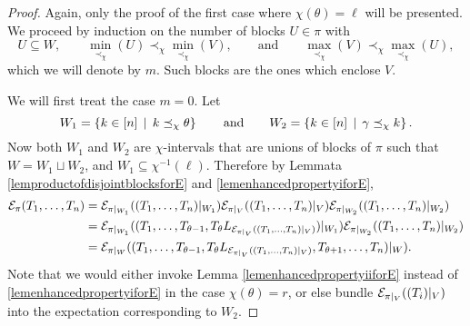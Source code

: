 		\begin{proof}
			Again, only the proof of the first case where $\chi(\theta) = \ell$ will be presented.
			We proceed by induction on the number of blocks $U\in\pi$ with
			\[
				U\subseteq W, \qquad
				\min_{\prec_\chi}(U) \prec_{\chi} \min_{\prec_\chi}(V), \qquad
				\text{and} \qquad
				\max_{\prec_\chi}(V)
				\prec_{\chi} \max_{\prec_\chi}(U),
			\]
			which we will denote by $m$.
			Such blocks are the ones which enclose $V$.

			We will first treat the case $m=0$.
			Let
			\[
				W_1 = \left\{k \in [n] \, \mid \, k \preceq_\chi \theta\right\} \qquad
				\text{and} \qquad
				W_2 = \left\{k \in [n] \, \mid \, \gamma \preceq_\chi k\right\}.
			\]
			Now both $W_1$ and $W_2$ are $\chi$-intervals that are unions of blocks of $\pi$ such that $W = W_1 \sqcup W_2$, and $W_1 \subseteq \chi^{-1}(\ell)$.
			Therefore by Lemmata \ref{lemproductofdisjointblocksforE} and \ref{lemenhancedpropertyiforE},
			\begin{align*}
				\mathcal{E}_\pi(T_1,\ldots, T_n) &=\mathcal{E}_{\pi|_{W_1}}((T_1,\ldots, T_n)|_{W_1})\mathcal{E}_{\pi|_{V}}((T_1,\ldots, T_n)|_{V})\mathcal{E}_{\pi|_{W_2}}((T_1,\ldots, T_n)|_{W_2}) \\
				& = \mathcal{E}_{\pi|_{W_1}}((T_1,\ldots, T_{\theta - 1}, T_\theta L_{\mathcal{E}_{\pi|_{V}}((T_1,\ldots, T_n)|_{V})})|_{W_1})\mathcal{E}_{\pi|_{W_2}}((T_1,\ldots, T_n)|_{W_2}) \\
				& =\mathcal{E}_{\pi|_{W}}((T_1,\ldots, T_{\theta - 1}, T_\theta L_{\mathcal{E}_{\pi|_{V}}((T_1,\ldots, T_n)|_{V})}, T_{\theta + 1}, \ldots, T_n)|_{W}).
			\end{align*}
			Note that we would either invoke Lemma \ref{lemenhancedpropertyiiforE} instead of \ref{lemenhancedpropertyiforE} in the case $\chi(\theta) = r$, or else bundle $\mathcal{E}_{\pi|_V}((T_i)|_V)$ into the expectation corresponding to $W_2$.


\end{proof}
